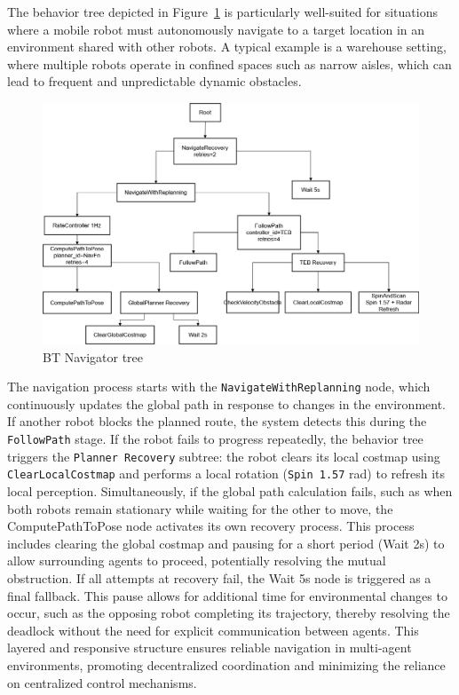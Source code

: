 \begin{itemize}
The behavior tree depicted in Figure~\ref{fig:BT_Navigator} is particularly well-suited for situations where a mobile robot must autonomously navigate to a target location in an environment shared with other robots. A typical example is a warehouse setting, where multiple robots operate in confined spaces such as narrow aisles, which can lead to frequent and unpredictable dynamic obstacles.

\end{itemize}
\begin{figure}[H]
    \centering
    \includegraphics[width=\linewidth]{Src//images/bt.png}
    \caption{BT Navigator tree}
    \label{fig:BT_Navigator}
\end{figure}


The navigation process starts with the \texttt{NavigateWithReplanning} node, which continuously updates the global path in response to changes in the environment. If another robot blocks the planned route, the system detects this during the \texttt{FollowPath} stage. If the robot fails to progress repeatedly, the behavior tree triggers the \texttt{Planner Recovery} subtree: the robot clears its local costmap using \texttt{ClearLocalCostmap} and performs a local rotation (\texttt{Spin 1.57} rad) to refresh its local perception.
Simultaneously, if the global path calculation fails, such as when both robots remain stationary while waiting for the other to move, the ComputePathToPose node activates its own recovery process. This process includes clearing the global costmap and pausing for a short period (Wait 2s) to allow surrounding agents to proceed, potentially resolving the mutual obstruction.
If all attempts at recovery fail, the Wait 5s node is triggered as a final fallback. This pause allows for additional time for environmental changes to occur, such as the opposing robot completing its trajectory, thereby resolving the deadlock without the need for explicit communication between agents.
This layered and responsive structure ensures reliable navigation in multi-agent environments, promoting decentralized coordination and minimizing the reliance on centralized control mechanisms.


